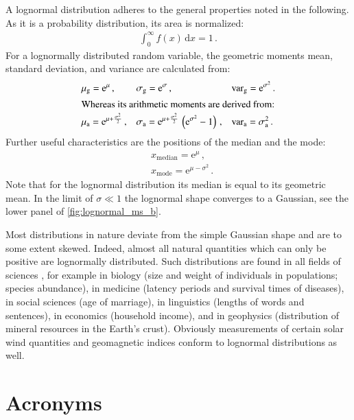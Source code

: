 A lognormal distribution adheres to the general properties noted in the following. As it is a probability distribution, its area is normalized:
\begin{align*}
	\int_0^\infty f(x) \, \text{d} x = 1	\,.
\end{align*}
For a lognormally distributed random variable, the geometric moments mean, standard deviation, and variance are calculated from:
\begin{align*}
	&\mu_\text{g} = \text{e}^\mu	\,,	&	&\sigma_\text{g} = \text{e}^\sigma	\,,	&	&\text{var}_\text{g} = \text{e}^{\sigma^2}	\,.\\
	\intertext{Whereas its arithmetic moments are derived from:}
	&\mu_\text{a} = \text{e}^{\mu + \frac{\sigma^2}{2}}	\,,	&	&\sigma_\text{a} = \text{e}^{\mu + \frac{\sigma^2}{2}} \, \left(\text{e}^{\sigma^2} - 1\right)	\,,	&	&\text{var}_\text{a} = \sigma_\text{a}^2\,.
\end{align*}
Further useful characteristics are the positions of the median and the mode:
\begin{align*}
	&x_\text{median} = \text{e}^{\mu}	\,,\\
	&x_\text{mode} = \text{e}^{\mu - \sigma^2}	\,.
\end{align*}
Note that for the lognormal distribution its median is equal to its geometric mean. In the limit of $\sigma \ll 1$ the lognormal shape converges to a Gaussian, see the lower panel of \autoref{fig:lognormal_ms_b}.

Most distributions in nature deviate from the simple Gaussian shape and are to some extent skewed. Indeed, almost all natural quantities which can only be positive are lognormally distributed. Such distributions are found in all fields of sciences \citep{Limpert2001}, for example in biology (size and weight of individuals in populations; species abundance), in medicine (latency periods and survival times of diseases), in social sciences (age of marriage), in linguistics (lengths of words and sentences), in economics (household income), and in geophysics (distribution of mineral resources in the Earth's crust). Obviously measurements of certain solar wind quantities and geomagnetic indices conform to lognormal distributions as well.


\section{Acronyms}
\label{sec:acronyms}

